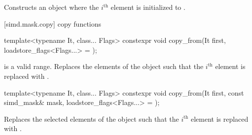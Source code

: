 \begin{itemdescr}
  \MaskLoadDescr
    {\validMaskedRange}
    {Constructs an object where the $i^\text{th}$ element is initialized to  \foralli.}
\end{itemdescr}

[simd.mask.copy]{\texorpdfstring{ copy}{simd_mask copy} functions}

\begin{itemdecl}
template<typename It, class... Flags>
  constexpr void copy_from(It first, loadstore_flags<Flags...> = {});
\end{itemdecl}

\begin{itemdescr}
  \MaskLoadDescr
  {\tcode{[first, first + size())} is a valid range.}
  {Replaces the elements of the  object such that the $i^\text{th}$ element is replaced with  \foralli.}
\end{itemdescr}

\begin{itemdecl}
template<typename It, class... Flags>
  constexpr void copy_from(It first, const simd_mask& mask, loadstore_flags<Flags...> = {});
\end{itemdecl}

\begin{itemdescr}
  \MaskLoadDescr
    {\validMaskedRange}
    {Replaces the selected elements of the  object such that the $i^\text{th}$ element is replaced with  \forallmaskedi.}
\end{itemdescr}

\newcommand\MaskStoreDescr[2]{
  \pnum\constraints
  \begin{itemize}
    \item \tcode{is_simd_flag_type_v<Flags>} is \tcode{true}, and
    \item \tcode{iter_value_t<Out>} is of type \tcode{bool}, and
    \item \tcode{Out} satisfies \tcode{contiguous_iterator}, and
    \item \tcode{Out} satisfies \tcode{output_iterator<value_type>}.
  \end{itemize}

  \pnum\expects
  \begin{itemize}
    \item #1
    \item \tcode{Out} models \tcode{contiguous_iterator}.
    \item \tcode{Out} models \tcode{output_iterator<value_type>}.
    \flagsRequires{simd_mask}{value_type}
  \end{itemize}

  \pnum\effects #2

  \pnum\throws Nothing.
}


